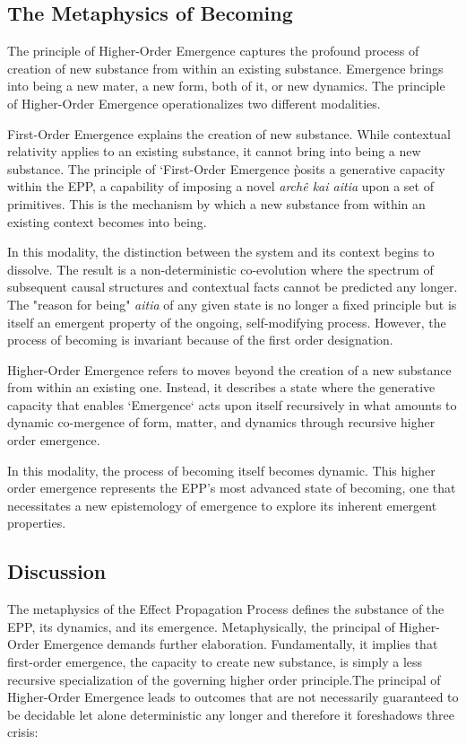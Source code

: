 \subsection{The Metaphysics of Becoming} 
\label{sec:metaphysics_becoming}

The principle of Higher-Order Emergence captures the profound process of creation of new substance from within an existing substance. 
Emergence brings into being a new mater, a new form, both of it, or new dynamics. The principle of Higher-Order Emergence operationalizes two different modalities.  

First-Order Emergence explains the creation of new substance. While contextual relativity applies to an existing substance, it cannot bring into being a new substance. The principle of `First-Order Emergence \` posits a generative capacity within the EPP, a capability of imposing a novel \textit{archê kai aitia} upon a set of primitives. This is the mechanism by which a new substance from within an existing context becomes into being.

In this modality, the distinction between the system and its context begins to dissolve. The result is a non-deterministic co-evolution where the spectrum of subsequent causal structures and contextual facts cannot be predicted any longer. The "reason for being" \textit{aitia} of any given state is no longer a fixed principle but is itself an emergent property of the ongoing, self-modifying process. However, the process of becoming is invariant because of the first order designation. 

Higher-Order Emergence refers to moves beyond the creation of a new substance from within an existing one. Instead, it describes a state where the generative capacity that enables `Emergence` acts upon itself recursively in what amounts to  dynamic co-mergence of form, matter, and dynamics through recursive higher order emergence. 

In this modality, the process of becoming itself becomes dynamic. This higher order emergence represents the EPP's most advanced state of becoming, one that necessitates a new epistemology of emergence to explore its inherent emergent properties.

\subsection{Discussion}
\label{sec:metaphysics_discussion}

The metaphysics of the Effect Propagation Process defines the substance of the EPP, its dynamics, 
and its emergence.  Metaphysically, the principal of Higher-Order Emergence demands further elaboration. 
Fundamentally, it implies that first-order emergence, the capacity to create new substance, is simply a less recursive specialization of the governing higher order principle.The principal of Higher-Order Emergence leads to outcomes that are not necessarily guaranteed to be decidable let alone deterministic any longer
and therefore it foreshadows three crisis:

